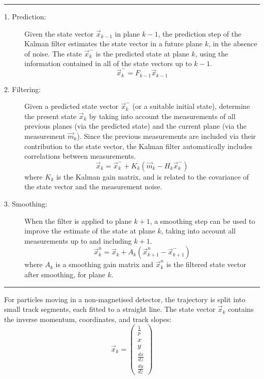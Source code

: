 \vspace{1em}\hrule\vspace{1em}
\begin{description}
    \item[1. Prediction:] Given the state vector $\vec{x}_{k-1}$ in plane $k-1$, the prediction step of the Kalman filter estimates the state vector in a future plane $k$, in the absence of noise. The state $\vec{x}_k^{-}$ is the predicted state at plane $k$, using the information contained in all of the state vectors up to $k-1$.
    \begin{equation}\label{eqn:kalman_prediction_step}
        \vec{x}_k^{-} = F_{k-1} \vec{x}_{k-1}
    \end{equation}

    \item[2. Filtering:] Given a predicted state vector $\vec{x}_k^{-}$ (or a suitable initial state), determine the present state $\vec{x}_k$ by taking into account the measurements of all previous planes (via the predicted state) and the current plane (via the measurement $\vec{m}_k$). Since the previous measurements are included via their contribution to the state vector, the Kalman filter automatically includes correlations between measurements.
    \begin{equation}\label{eqn:kalman_filtering_step}
        \vec{x}_k = \vec{x}_k^{-} + K_k \left(\vec{m}_k - H_k\vec{x}_k^{-} \right)
    \end{equation}
    where $K_k$ is the Kalman gain matrix, and is related to the covariance of the state vector and the measurement noise.

    \item[3. Smoothing:] When the filter is applied to plane $k+1$, a smoothing step can be used to improve the estimate of the state at plane $k$, taking into account all measurements up to and including $k+1$.
    \begin{equation}
        \vec{x}_k^{n} = \vec{x}_k + A_k \left(\vec{x}_{k+1}^n - \vec{x}_{k+1}^{-}\right)
    \end{equation}
    where $A_k$ is a smoothing gain matrix and $\vec{x}_k^n$ is the filtered state vector after smoothing, for plane $k$.
\end{description}
\vspace{1em}\hrule\vspace{1em}

For particles moving in a non-magnetised detector, the trajectory is split into small track segments, each fitted to a straight line. The state vector $\vec{x}_k$ contains the inverse momentum, coordinates, and track slopes:
\begin{equation}\label{eqn:kalman_state_vector}
    \vec{x}_k = \left( \begin{array}{c} \frac{1}{p} \\ x \\ y \\ \frac{dx}{dz} \\ \frac{dy}{dz} \end{array} \right)
\end{equation}

